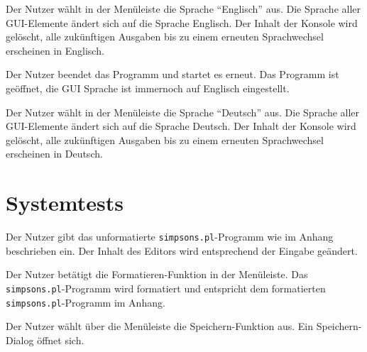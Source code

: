 \documentclass[parskip=full,11pt,twoside]{scrartcl}
\begin{document}
\begin{minipage}{\linewidth}
\end{minipage}


{Der Nutzer wählt in der Menüleiste die Sprache \enquote{Englisch} aus.}
{Die Sprache aller GUI-Elemente ändert sich auf die Sprache Englisch. Der Inhalt der Konsole wird gelöscht, alle zukünftigen Ausgaben bis zu einem erneuten Sprachwechsel erscheinen in Englisch.}

{Der Nutzer beendet das Programm und startet es erneut.}
{Das Programm ist geöffnet, die GUI Sprache ist immernoch auf Englisch eingestellt.}

{Der Nutzer wählt in der Menüleiste die Sprache \enquote{Deutsch} aus.}
{Die Sprache aller GUI-Elemente ändert sich auf die Sprache Deutsch. Der Inhalt der Konsole wird gelöscht, alle zukünftigen Ausgaben bis zu einem erneuten Sprachwechsel erscheinen in Deutsch.}

\section{Systemtests}


{Der Nutzer gibt das unformatierte \texttt{simpsons.pl}-Programm wie im Anhang beschrieben ein.}
{Der Inhalt des Editors wird entsprechend der Eingabe geändert.}

{Der Nutzer betätigt die Formatieren-Funktion in der Menüleiste.}
{Das \texttt{simpsons.pl}-Programm wird formatiert und entspricht dem formatierten \texttt{simpsons.pl}-Programm im Anhang.}

{Der Nutzer wählt über die Menüleiste die Speichern-Funktion aus.}
{Ein Speichern-Dialog öffnet sich.}
\end{document}
